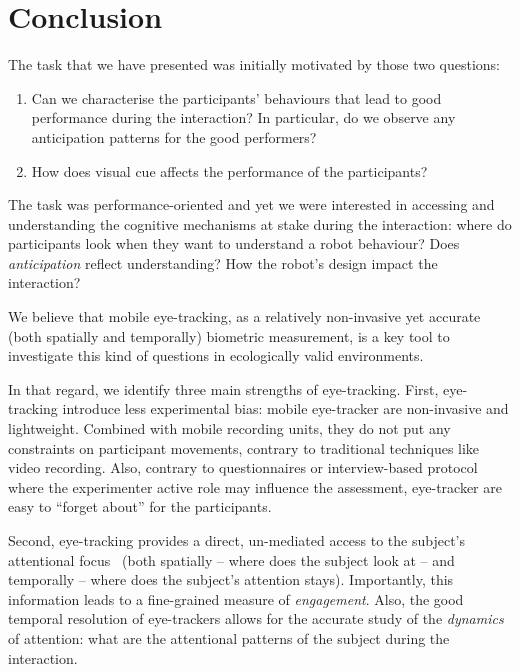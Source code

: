 \documentclass{sig-alternate}
\begin{document}

\section{Conclusion}
\label{conclusion}

The task that we have presented was initially motivated by those two questions:

\begin{enumerate}
    \item Can we characterise the participants' behaviours that
        lead to good performance during the interaction? In particular, do
        we observe any anticipation patterns for the good performers?

    \item How does visual cue affects the performance of the participants?

\end{enumerate}

The task was performance-oriented and yet we were interested in accessing and
understanding the cognitive mechanisms at stake during the interaction: where do participants look when they want to understand a robot behaviour? Does
\emph{anticipation} reflect understanding? How the robot's design impact the
interaction?

We believe that mobile eye-tracking, as a relatively non-invasive yet accurate
(both spatially and temporally) biometric measurement, is a key tool to
investigate this kind of questions in ecologically valid environments.

In that regard, we identify three main strengths of eye-tracking. First,
eye-tracking introduce less experimental bias: mobile eye-tracker are
non-invasive and lightweight. Combined with mobile recording units, they do not
put any constraints on participant movements, contrary to traditional techniques
like video recording. Also, contrary to questionnaires or interview-based
protocol where the experimenter active role may influence the assessment,
eye-tracker are easy to ``forget about'' for the participants.

Second, eye-tracking provides a direct, un-mediated access to the subject's
attentional focus~\cite{sharma2014withmeness} (both spatially -- where does the
subject look at -- and temporally -- where does the subject's attention stays).
Importantly, this information leads to a fine-grained measure of
\emph{engagement}.  Also, the good temporal resolution of eye-trackers allows
for the accurate study of the \emph{dynamics} of attention: what are the
attentional patterns of the subject during the interaction.
\end{document}
